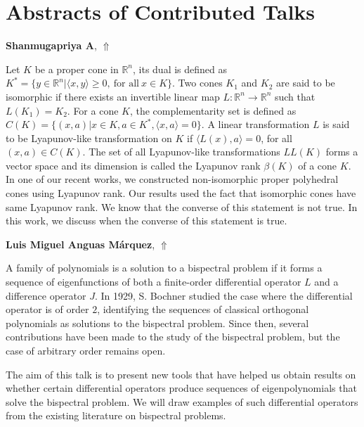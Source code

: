 \documentclass[ILAS2025-program.tex]{subfiles}
\begin{document}
\section{Abstracts of Contributed Talks}


\hypertarget{down0423}{}\begin{ilasabstract}
    
\textbf{Shanmugapriya A},  \hfill \hyperlink{up0423}{$\Uparrow$}
    
    
\mtskip
    Let $K$ be a proper cone in $\mathbb{R}^n$, its dual is defined as $K^*=\{y\in \mathbb{R}^n|\langle x,y\rangle\geq 0, ~\mbox{for all}~ x\in K\}$. Two cones $K_1$ and $K_2$ are said to be isomorphic if there exists an invertible linear map $L:\mathbb{R}^n\rightarrow \mathbb{R}^n$ such that  $L(K_1)=K_2$. For a cone $K$, the complementarity set is defined as $C(K)=\{(x,a)|x\in K, a\in K^*,\langle x,a \rangle=0\}$. A linear transformation $L$ is said to be Lyapunov-like transformation on $K$ if $\langle L(x), a \rangle=0$, for all $(x,a)\in C(K)$. The set of all Lyapunov-like transformations $LL(K)$ forms a vector space and its dimension is called the Lyapunov rank $\beta(K)$ of a cone $K$. In one of our recent works, we constructed non-isomorphic proper polyhedral cones using Lyapunov rank. Our results used the fact that isomorphic cones have same Lyapunov rank.  We know that the converse of this statement is not true. In this work, we discuss  when the converse of this statement is true. 

\end{ilasabstract}
    

\hypertarget{down0401}{}\begin{ilasabstract}
    
\textbf{Luis Miguel Anguas Márquez},  \hfill \hyperlink{up0401}{$\Uparrow$}
    
    
\mtskip
    A family of polynomials is a solution to a bispectral problem if it forms a sequence of eigenfunctions of both a finite-order differential operator $L$ and a difference operator $J$. In 1929, S. Bochner studied the case where the differential operator is of order $2$, identifying the sequences of classical orthogonal polynomials as solutions to the bispectral problem. Since then, several contributions have been made to the study of the bispectral problem, but the case of arbitrary order remains open.

The aim of this talk is to present new tools that have helped us obtain results on whether certain differential operators produce sequences of eigenpolynomials that solve the bispectral problem. We will draw examples of such differential operators from the existing literature on bispectral problems.
\end{ilasabstract}
    
\end{document}
